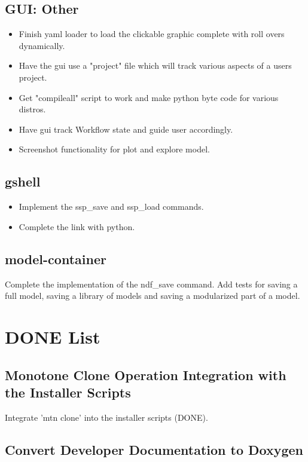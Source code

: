 \documentclass[12pt]{article}
\begin{document}
\subsection{GUI: Other}
\begin{itemize}
\item Finish yaml loader to load the clickable graphic complete with
  roll overs dynamically.
\item Have the gui use a "project" file which will track various
  aspects of a users project.
\item Get "compileall" script to work and make python byte code for
  various distros.
\item Have gui track Workflow state and guide user accordingly.
\item Screenshot functionality for plot and explore model.
\end{itemize}

\subsection{gshell}
\begin{itemize}
\item Implement the ssp\_save and ssp\_load commands.
\item Complete the link with python.
\end{itemize}


\subsection{model-container}
Complete the implementation of the ndf\_save command.  Add tests for
saving a full model, saving a library of models and saving a
modularized part of a model.

\section{DONE List}

\subsection{Monotone Clone Operation Integration with the Installer Scripts}
Integrate 'mtn clone' into the installer scripts (DONE).

\subsection{Convert Developer Documentation to Doxygen}
\end{document}
